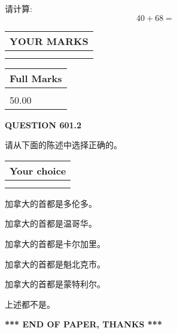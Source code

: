 \documentclass{ctexart}
\begin{document}
  
 
请计算:
\begin{equation}
40 +  %
68 = \nonumber
\end{equation}
 

 

 
  
\vspace{0.2in}
  
\noindent\begin{tabular}{|l|}
\hline
 YOUR MARKS  \\
\hline
 \\ 
 \\ 
\hline
\end{tabular}
\hspace{0.05in} \begin{tabular}{|l|}
\hline
 Full Marks  \\
\hline
 \\ 
50.00 \\
\hline
\end{tabular}
{\textbf{\Large{QUESTION
601.2 
}}}
  
  
请从下面的陈述中选择正确的。
  
  
\noindent\hspace{3.0in} \begin{tabular}{|l|}
\hline
Your choice \\
\hline
 \\ 
 \\ 
\hline
\end{tabular}
  
  
 
 
加拿大的首都是多伦多。
 
 
加拿大的首都是温哥华。
 
 
加拿大的首都是卡尔加里。
 
 
加拿大的首都是魁北克市。
 
 
加拿大的首都是蒙特利尔。
 
 
 上述都不是。
 
 
   
   
 \vspace{0.2in}
 
   
   
   
   
\vspace{1.0in} 
{\textbf{\large{ *** END OF PAPER, THANKS *** }}} 
   
\end{document}
